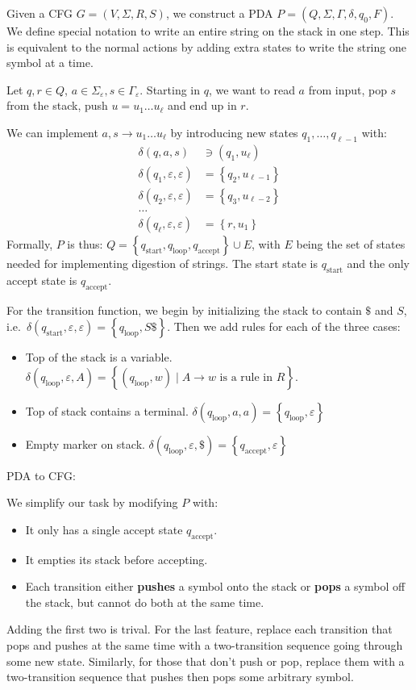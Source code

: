 \documentclass[12 pt]{article}
\begin{document}
Given a CFG $G = (V, \Sigma, R, S)$, we construct a PDA $P = (Q,
\Sigma, \Gamma, \delta, q_0, F)$. We define special notation to write
an entire string on the stack in one step. This is equivalent to the
normal actions by adding extra states to write the string one symbol
at a time.

Let $q, r \in Q$, $a \in \Sigma_\varepsilon, s \in
\Gamma_{\varepsilon}$. Starting in $q$, we want to read $a$ from
input, pop $s$ from the stack, push $u = u_1 \ldots u_\ell$ and end up
in $r$.

We can implement $a,s \to u_1 \ldots u_\ell$ by introducing new states
$q_1, \ldots, q_{\ell - 1}$ with:
\begin{align*}
  \delta(q,a,s) & \ni (q_1, u_\ell)
  \\ \delta(q_1, \varepsilon, \varepsilon) & = \left\{q_2, u_{\ell - 1}\right\}
  \\ \delta(q_2, \varepsilon, \varepsilon) & = \left\{q_3, u_{\ell - 2}\right\}
  \\ \ldots
  \\ \delta(q_\ell, \varepsilon, \varepsilon) & = \left\{r, u_{1}\right\}
\end{align*}
Formally, $P$ is thus: $Q = \left\{q_{\text{start}}, q_{\text{loop}},
  q_{\text{accept}}\right\} \cup E$, with $E$ being the set of states
needed for implementing digestion of strings. The start state is
$q_{\text{start}}$ and the only accept state is $q_{\text{accept}}$.

For the transition function, we begin by initializing the stack to
contain $\$$ and $S$, i.e.\ $\delta(q_{\text{start}}, \varepsilon,
\varepsilon) = \left\{q_{\text{loop}}, S\$\right\}$. Then we add rules
for each of the three cases:
\begin{itemize}
\item Top of the stack is a variable. $\delta(q_{\text{loop}},
  \varepsilon, A) = \left\{(q_{\text{loop}}, w) \mid A \to w \text{ is
    a rule in } R\right\}$.
\item Top of stack contains a terminal. $\delta(q_{\text{loop}},
  a, a) = \left\{q_{\text{loop}}, \varepsilon\right\}$
\item Empty marker on stack. $\delta(q_{\text{loop}}, \varepsilon, \$)
  = \left\{q_{\text{accept}}, \varepsilon\right\}$
\end{itemize}
PDA to CFG:\

We simplify our task by modifying $P$ with:
\begin{itemize}
\item It only has a single accept state $q_{\text{accept}}$.
\item It empties its stack before accepting.
\item Each transition either \textbf{pushes} a symbol onto the stack
  or \textbf{pops} a symbol off the stack, but cannot do both at the
  same time.
\end{itemize}
Adding the first two is trival. For the last feature, replace each
transition that pops and pushes at the same time with a two-transition
sequence going through some new state. Similarly, for those that don't push or
pop, replace them with a two-transition sequence that pushes then pops
some arbitrary symbol.
\end{document}
